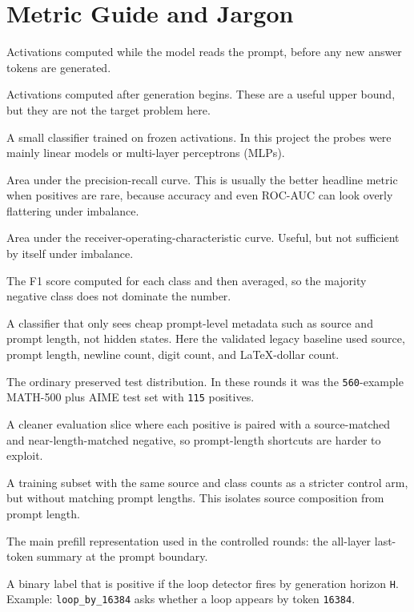 \documentclass[11pt]{article}
\begin{document}
\section*{Metric Guide and Jargon}
\begin{description}[style=nextline,leftmargin=1.8em]
  \item[Prefill] Activations computed while the model reads the prompt, before any new answer tokens are generated.
  \item[Completion or posterior] Activations computed after generation begins. These are a useful upper bound, but they are not the target problem here.
  \item[Probe] A small classifier trained on frozen activations. In this project the probes were mainly linear models or multi-layer perceptrons (MLPs).
  \item[PR-AUC] Area under the precision-recall curve. This is usually the better headline metric when positives are rare, because accuracy and even ROC-AUC can look overly flattering under imbalance.
  \item[ROC-AUC] Area under the receiver-operating-characteristic curve. Useful, but not sufficient by itself under imbalance.
  \item[Macro-F1] The F1 score computed for each class and then averaged, so the majority negative class does not dominate the number.
  \item[Metadata baseline] A classifier that only sees cheap prompt-level metadata such as source and prompt length, not hidden states. Here the validated legacy baseline used source, prompt length, newline count, digit count, and LaTeX-dollar count.
  \item[Natural test] The ordinary preserved test distribution. In these rounds it was the \texttt{560}-example MATH-500 plus AIME test set with \texttt{115} positives.
  \item[Matched test] A cleaner evaluation slice where each positive is paired with a source-matched and near-length-matched negative, so prompt-length shortcuts are harder to exploit.
  \item[Source-control] A training subset with the same source and class counts as a stricter control arm, but without matching prompt lengths. This isolates source composition from prompt length.
  \item[Anchor] The main prefill representation used in the controlled rounds: the all-layer last-token summary at the prompt boundary.
  \item[\texttt{loop\_by\_H}] A binary label that is positive if the loop detector fires by generation horizon \texttt{H}. Example: \texttt{loop\_by\_16384} asks whether a loop appears by token \texttt{16384}.

\end{description}
\end{document}
